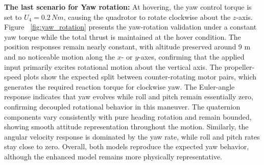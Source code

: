 \textbf{The last scenario for Yaw rotation:} 
At hovering, the yaw control torque is set to $U_{4} = 0.2\,Nm$, causing the quadrotor 
to rotate clockwise about the $z$-axis. Figure ~\ref{fig:yaw_rotation} presents the yaw-rotation validation under a constant yaw torque while the total thrust is maintained at the hover condition. The position responses remain nearly constant, with altitude preserved around 9 m and no noticeable motion along the \(x\)- or \(y\)-axes, confirming that the applied input primarily excites rotational motion about the vertical axis. The propeller-speed plots show the expected split between counter-rotating motor pairs, which generates the required reaction torque for clockwise yaw. The Euler-angle response indicates that yaw evolves while roll and pitch remain essentially zero, confirming decoupled rotational behavior in this maneuver. The quaternion components vary consistently with pure heading rotation and remain bounded, showing smooth attitude representation throughout the motion. Similarly, the angular velocity response is dominated by the yaw rate, while roll and pitch rates stay close to zero. Overall, both models reproduce the expected yaw behavior, although the enhanced model remains more physically representative.


    



